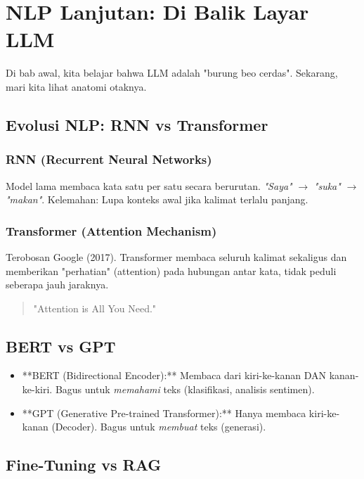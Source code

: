 \chapter{NLP Lanjutan: Di Balik Layar LLM}
\label{chap:nlp_adv}

Di bab awal, kita belajar bahwa LLM adalah "burung beo cerdas". Sekarang, mari kita lihat anatomi otaknya.

\section{Evolusi NLP: RNN vs Transformer}

\subsection{RNN (Recurrent Neural Networks)}
Model lama membaca kata satu per satu secara berurutan.
\textit{"Saya"} $\rightarrow$ \textit{"suka"} $\rightarrow$ \textit{"makan"}.
Kelemahan: Lupa konteks awal jika kalimat terlalu panjang.

\subsection{Transformer (Attention Mechanism)}
Terobosan Google (2017). Transformer membaca seluruh kalimat sekaligus dan memberikan "perhatian" (attention) pada hubungan antar kata, tidak peduli seberapa jauh jaraknya.

\begin{quote}
"Attention is All You Need."
\end{quote}

\section{BERT vs GPT}

\begin{itemize}
    \item **BERT (Bidirectional Encoder):** Membaca dari kiri-ke-kanan DAN kanan-ke-kiri. Bagus untuk \textit{memahami} teks (klasifikasi, analisis sentimen).
    \item **GPT (Generative Pre-trained Transformer):** Hanya membaca kiri-ke-kanan (Decoder). Bagus untuk \textit{membuat} teks (generasi).
\end{itemize}

\section{Fine-Tuning vs RAG}

